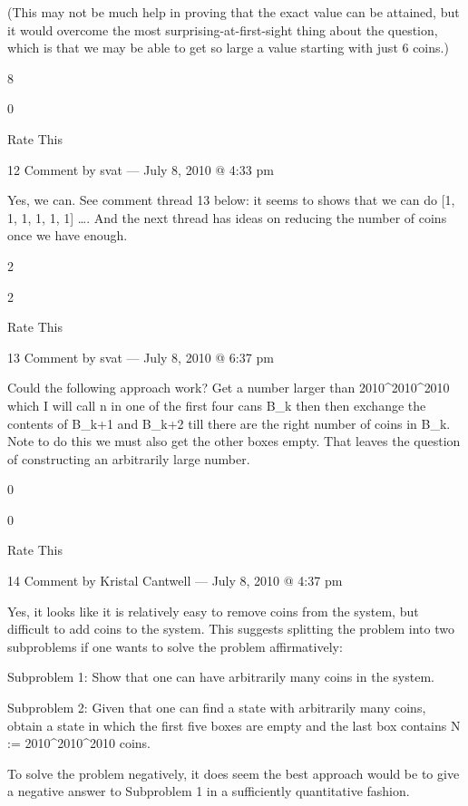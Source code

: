     (This may not be much help in proving that the exact value can be attained, but it would overcome the most surprising-at-first-sight thing about the question, which is that we may be able to get so large a value starting with just 6 coins.)
     
    8
     
    0
     
    Rate This

    12 Comment by svat — July 8, 2010 @ 4:33 pm

        Yes, we can. See comment thread 13 below: it seems to shows that we can do
        [1, 1, 1, 1, 1, 1] \to [0, 0, 7, 1, 1, 1] \to [0, 0, 7, 1, 0, 3] \to [0, 0, 6, 1, 0, 2^3] \to [0, 0, 5, 1, 0, 2^{2^3}] \to \dots \to [0, 0, 0, 1, 0, 2^{2^{2^{2^{2^{2^{2^3}}}}}}]. And the next thread has ideas on reducing the number of coins once we have enough.
         
        2
         
        2
         
        Rate This

        13 Comment by svat — July 8, 2010 @ 6:37 pm

    Could the following approach work? Get a number larger than 2010^{2010^{2010}} which I will call n in one of the first
    four cans B_k then then exchange the contents of B_{k+1} and B_{k+2} till there are the right number of coins in B_k. Note to do this we must also get the other boxes empty. That leaves the question of constructing an arbitrarily large number.
     
    0
     
    0
     
    Rate This

    14 Comment by Kristal Cantwell — July 8, 2010 @ 4:37 pm

        Yes, it looks like it is relatively easy to remove coins from the system, but difficult to add coins to the system. This suggests splitting the problem into two subproblems if one wants to solve the problem affirmatively:

        Subproblem 1: Show that one can have arbitrarily many coins in the system.

        Subproblem 2: Given that one can find a state with arbitrarily many coins, obtain a state in which the first five boxes are empty and the last box contains N := 2010^{2010^{2010}} coins.

        To solve the problem negatively, it does seem the best approach would be to give a negative answer to Subproblem 1 in a sufficiently quantitative fashion.
         
